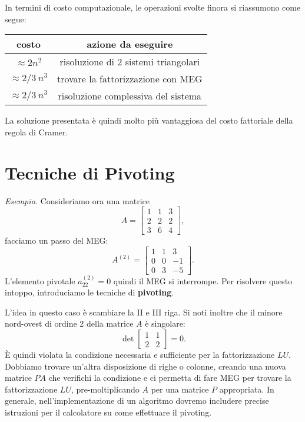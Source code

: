 In termini di costo computazionale, le operazioni svolte finora si riassumono come segue:
\begin{center}
\begin{tabular}{cc}
\toprule
 costo & azione da eseguire \\
\midrule
 $\approx 2n^{2}$ & risoluzione di $2$ sistemi triangolari \\
$\approx 2/3 \ n^{3}$ & trovare la fattorizzazione con MEG \\
\hline
$\approx 2/3 \ n^{3}$ & risoluzione complessiva del sistema \\
 \bottomrule
\end{tabular}

\end{center}
La soluzione presentata è quindi molto più vantaggiosa del costo fattoriale della regola di Cramer.

\section{Tecniche di Pivoting}

\textit{Esempio.}
Consideriamo ora una matrice
\begin{equation*}
A=\begin{bmatrix}
1 & 1 & 3\\
2 & 2 & 2\\
3 & 6 & 4
\end{bmatrix},
\end{equation*}
facciamo un passo del MEG:
\begin{equation*}
A^{(2)} =\begin{bmatrix}
1 & 1 & 3\\
0 & 0 & -1\\
0 & 3 & -5
\end{bmatrix}.
\end{equation*}
L'elemento pivotale $\displaystyle a^{(2)}_{22} =0$ quindi il MEG si interrompe.
Per risolvere questo intoppo, introduciamo le tecniche di \textbf{pivoting}.

L'idea in questo caso è scambiare la II e III riga.
Si noti inoltre che il minore nord-ovest di ordine 2 della matrice $A$ è singolare:
\begin{equation*}
\operatorname{det}\begin{bmatrix}
1 & 1 \\
2 & 2
\end{bmatrix} = 0.
\end{equation*}
È quindi violata la condizione necessaria e sufficiente per la fattorizzazione $LU$. Dobbiamo trovare un'altra disposizione di righe o colonne, creando una nuova matrice $PA$ che verifichi la condizione e ci permetta di fare MEG per trovare la fattorizzazione $LU$, pre-moltiplicando $A$ per una matrice $P$ appropriata.
In generale, nell'implementazione di un algoritmo dovremo includere precise istruzioni per il calcolatore su come effettuare il pivoting.

